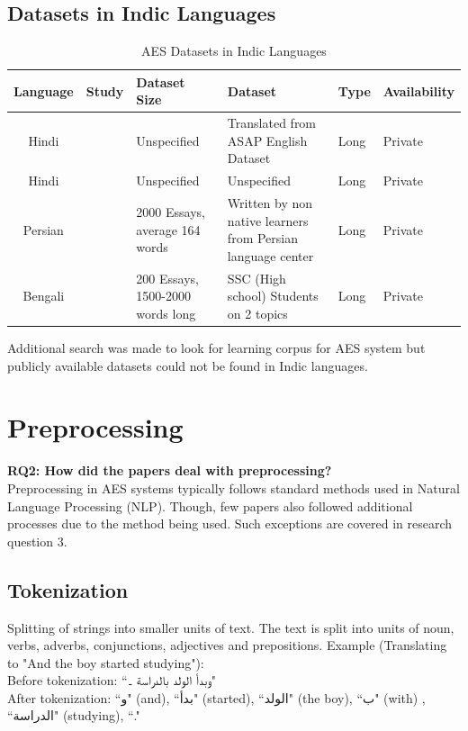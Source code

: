 \documentclass{article}
\begin{document}
	\subsection*{Datasets in Indic Languages}
	\begin{table}[H]
		\centering
		\begin{tabularx}{7in}{|c|m{2cm}|X|p{1.5in}|p{1cm}|p{1.5cm}|}
			\hline
			Language & Study & Dataset Size & Dataset & Type & Availability \\ \hline
			Hindi & \textcite{10_singh2023hindi} & Unspecified & Translated from ASAP English Dataset & Long & Private \\ \hline
			Hindi & \textcite{11_walia2024hybrid} & Unspecified & Unspecified & Long & Private \\ \hline
			Persian & \textcite{9_firoozi2024bert} & 2000 Essays, average 164 words & Written by non native learners from Persian language center & Long & Private \\ \hline
			Bengali & \textcite{24_islam2013abess} & 200 Essays, 1500-2000 words long & SSC (High school) Students on 2 topics & Long & Private \\
			\hline
		\end{tabularx}
		\caption{AES Datasets in Indic Languages}
		\label{datasetindic}
	\end{table}
	
	Additional search was made to look for learning corpus for AES system but publicly available datasets could not be found in Indic languages.
	
	\section{Preprocessing}
	\textbf{RQ2: How did the papers deal with preprocessing?} \\
	Preprocessing in AES systems typically follows standard methods used in Natural Language Processing (NLP). Though, few papers also followed additional processes due to the method being used. Such exceptions are covered in research question 3.
	\subsection{Tokenization}
	Splitting of strings into smaller units of text. The text is split into units of noun, verbs, adverbs, conjunctions, adjectives and prepositions.
	Example (Translating to "And the boy started studying"): \\
	Before tokenization: ``\textarabic{وبدأ الولد بالدراسة ۔}" \\
	After tokenization:
	``\textarabic{و}" (and), ``\textarabic{بدأ}" (started), ``\textarabic{الولد}" (the boy), ``\textarabic{ب}" (with) , ``\textarabic{الدراسة}" (studying), ``."
	
\end{document}
